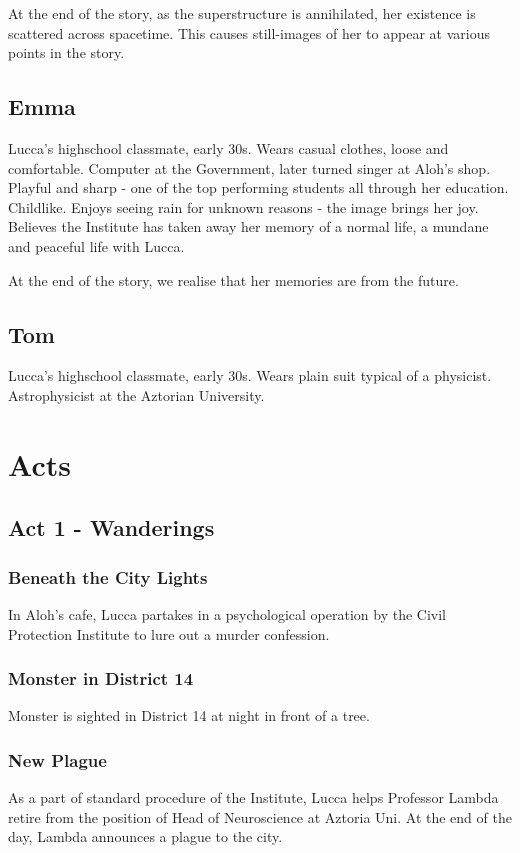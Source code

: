 \documentclass[11pt]{article}
\begin{document}
	At the end of the story, as the superstructure is annihilated, her existence is scattered across spacetime. 
	This causes still-images of her to appear at various points in the story. 
	\subsection{Emma}
	Lucca's highschool classmate, early 30s.
	Wears casual clothes, loose and comfortable. 
	Computer at the Government, later turned singer at Aloh's shop.
	Playful and sharp - one of the top performing students all through her education.
	Childlike.
	Enjoys seeing rain for unknown reasons - the image brings her joy. 
	Believes the Institute has taken away her memory of a normal life, a mundane and peaceful life with Lucca.
	
	At the end of the story, we realise that her memories are from the future.
	\subsection{Tom}
	Lucca's highschool classmate, early 30s.
	Wears plain suit typical of a physicist.
	Astrophysicist at the Aztorian University. 
	
\newpage






\section{Acts}
	\subsection{Act 1 - Wanderings}
		\subsubsection{Beneath the City Lights}
		In Aloh's cafe, Lucca partakes in a psychological operation by the Civil Protection Institute to lure out a murder confession.
		\subsubsection{Monster in District 14}
		Monster is sighted in District 14 at night in front of a tree.
		\subsubsection{New Plague}
		As a part of standard procedure of the Institute, Lucca helps Professor Lambda retire from the position of Head of Neuroscience at Aztoria Uni.
		At the end of the day, Lambda announces a plague to the city.
\end{document}
